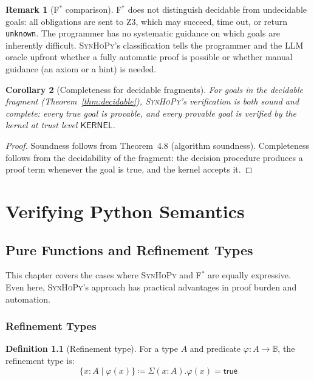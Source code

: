 \documentclass[11pt,a4paper]{report}
\theoremstyle{definition}
\newtheorem{definition}{Definition}[chapter]
\newtheorem{remark}[definition]{Remark}
\theoremstyle{plain}
\newtheorem{corollary}[definition]{Corollary}
\newcommand{\Bool}{\mathbb{B}}
\newcommand{\defeq}{\coloneqq}
\newcommand{\fstar}{F$^{*}$}
\newcommand{\synhopy}{\textsc{SynHoPy}}
\begin{document}
\begin{remark}[\fstar{} comparison]
\fstar{} does not distinguish decidable from undecidable goals: all
obligations are sent to Z3, which may succeed, time out, or return
\texttt{unknown}. The programmer has no systematic guidance on which
goals are inherently difficult. \synhopy{}'s classification tells the
programmer and the LLM oracle upfront whether a fully automatic proof
is possible or whether manual guidance (an axiom or a hint) is needed.
\end{remark}

\begin{corollary}[Completeness for decidable fragments]
For goals in the decidable fragment (Theorem~\ref{thm:decidable}),
\synhopy{}'s verification is both sound and complete: every true goal
is provable, and every provable goal is verified by the kernel at trust
level $\mathsf{KERNEL}$.
\end{corollary}
\begin{proof}
Soundness follows from Theorem~4.8 (algorithm soundness). Completeness
follows from the decidability of the fragment: the decision procedure
produces a proof term whenever the goal is true, and the kernel accepts
it.
\end{proof}



\part{Verifying Python Semantics}

\chapter{Pure Functions and Refinement Types}
\label{ch:pure}

This chapter covers the cases where \synhopy{} and \fstar{} are equally
expressive. Even here, \synhopy{}'s approach has practical advantages in
proof burden and automation.

\section{Refinement Types}

\begin{definition}[Refinement type]
For a type $A$ and predicate $\varphi : A \to \Bool$, the refinement type is:
\[
  \{x : A \mid \varphi(x)\} \defeq \Sigma(x : A). \varphi(x) = \mathsf{true}
\]
\end{definition}
\end{document}
